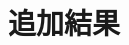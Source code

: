 \documentclass[MIRU,submit]{miru2026j}
\theoremstyle{definition}
\newcommand{\sss}[1]{{\scriptscriptstyle (#1)}}
\begin{document}




\section{追加結果}\label{appendix:additional_results}
\end{document}
